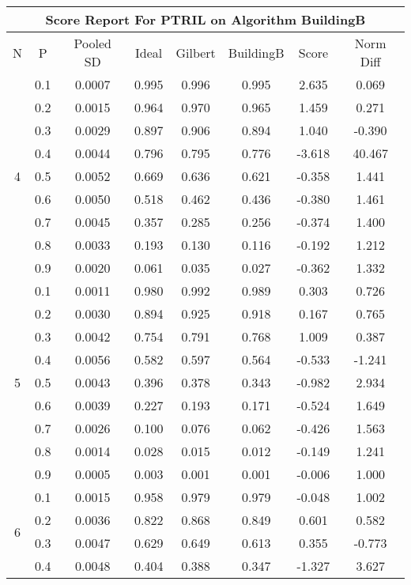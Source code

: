 \documentclass[11pt,a4paper]{report}
\begin{document}
\begin{longtable}{ | c | c || c | c | c | c | c | c | }
\hline
\multicolumn{8}{|c|}{ Score Report For PTRIL on Algorithm BuildingB} \\
\hline
N & P & Pooled SD &  Ideal &  Gilbert & BuildingB  & Score & Norm Diff \\
 \hline
 \hline
 \endhead
\multirow{9}{*}{4} & 0.1 & 0.0007 & 0.995 & 0.996 & 0.995 & 2.635 & 0.069 \\
 & 0.2 & 0.0015 & 0.964 & 0.970 & 0.965 & 1.459 & 0.271 \\
 & 0.3 & 0.0029 & 0.897 & 0.906 & 0.894 & 1.040 & -0.390 \\
 & 0.4 & 0.0044 & 0.796 & 0.795 & 0.776 & -3.618 & 40.467 \\
 & 0.5 & 0.0052 & 0.669 & 0.636 & 0.621 & -0.358 & 1.441 \\
 & 0.6 & 0.0050 & 0.518 & 0.462 & 0.436 & -0.380 & 1.461 \\
 & 0.7 & 0.0045 & 0.357 & 0.285 & 0.256 & -0.374 & 1.400 \\
 & 0.8 & 0.0033 & 0.193 & 0.130 & 0.116 & -0.192 & 1.212 \\
 & 0.9 & 0.0020 & 0.061 & 0.035 & 0.027 & -0.362 & 1.332 \\
 \hline
\multirow{9}{*}{5} & 0.1 & 0.0011 & 0.980 & 0.992 & 0.989 & 0.303 & 0.726 \\
 & 0.2 & 0.0030 & 0.894 & 0.925 & 0.918 & 0.167 & 0.765 \\
 & 0.3 & 0.0042 & 0.754 & 0.791 & 0.768 & 1.009 & 0.387 \\
 & 0.4 & 0.0056 & 0.582 & 0.597 & 0.564 & -0.533 & -1.241 \\
 & 0.5 & 0.0043 & 0.396 & 0.378 & 0.343 & -0.982 & 2.934 \\
 & 0.6 & 0.0039 & 0.227 & 0.193 & 0.171 & -0.524 & 1.649 \\
 & 0.7 & 0.0026 & 0.100 & 0.076 & 0.062 & -0.426 & 1.563 \\
 & 0.8 & 0.0014 & 0.028 & 0.015 & 0.012 & -0.149 & 1.241 \\
 & 0.9 & 0.0005 & 0.003 & 0.001 & 0.001 & -0.006 & 1.000 \\
 \hline
\multirow{9}{*}{6} & 0.1 & 0.0015 & 0.958 & 0.979 & 0.979 & -0.048 & 1.002 \\
 & 0.2 & 0.0036 & 0.822 & 0.868 & 0.849 & 0.601 & 0.582 \\
 & 0.3 & 0.0047 & 0.629 & 0.649 & 0.613 & 0.355 & -0.773 \\
 & 0.4 & 0.0048 & 0.404 & 0.388 & 0.347 & -1.327 & 3.627 \\

\end{longtable}
\end{document}
